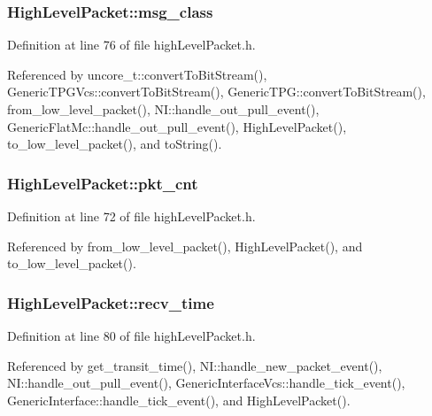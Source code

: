 \subsubsection[{msg\_\-class}]{ {\bf HighLevelPacket::msg\_\-class}}\label{classHighLevelPacket_e46f274428c73774b8ab21ca885b84ec}




Definition at line 76 of file highLevelPacket.h.

Referenced by uncore\_\-t::convertToBitStream(), GenericTPGVcs::convertToBitStream(), GenericTPG::convertToBitStream(), from\_\-low\_\-level\_\-packet(), NI::handle\_\-out\_\-pull\_\-event(), GenericFlatMc::handle\_\-out\_\-pull\_\-event(), HighLevelPacket(), to\_\-low\_\-level\_\-packet(), and toString().
\subsubsection[{pkt\_\-cnt}]{ {\bf HighLevelPacket::pkt\_\-cnt}}\label{classHighLevelPacket_9e92e51a445389b6c84874638582c156}




Definition at line 72 of file highLevelPacket.h.

Referenced by from\_\-low\_\-level\_\-packet(), HighLevelPacket(), and to\_\-low\_\-level\_\-packet().
\subsubsection[{recv\_\-time}]{ {\bf HighLevelPacket::recv\_\-time}}\label{classHighLevelPacket_5de1d4d144aa5e9fdac1a3988384d92f}




Definition at line 80 of file highLevelPacket.h.

Referenced by get\_\-transit\_\-time(), NI::handle\_\-new\_\-packet\_\-event(), NI::handle\_\-out\_\-pull\_\-event(), GenericInterfaceVcs::handle\_\-tick\_\-event(), GenericInterface::handle\_\-tick\_\-event(), and HighLevelPacket().
